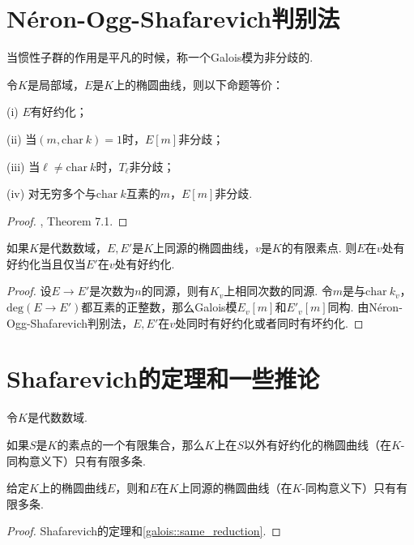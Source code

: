 \section{Néron-Ogg-Shafarevich判别法}

当惯性子群的作用是平凡的时候，称一个Galois模为非分歧的.

\begin{cthm}
    令$K$是局部域，$E$是$K$上的椭圆曲线，则以下命题等价：

    (i) $E$有好约化；

    (ii) 当$(m, \mathrm{char}\ k)=1$时，$E[m]$非分歧；

    (iii) 当$\ell\neq \mathrm{char}\ k$时，$T_{\ell}$非分歧；

    (iv) 对无穷多个与$\mathrm{char}\ k$互素的$m$，$E[m]$非分歧.
\end{cthm}

\begin{proof}
    \cite{silverman2009arithmetic}, Theorem 7.1.
\end{proof}

\begin{ccor}
    如果$K$是代数数域，$E, E'$是$K$上同源的椭圆曲线，$v$是$K$的有限素点. 则$E$在$v$处有好约化当且仅当$E'$在$v$处有好约化. \label{galois::same_reduction}
\end{ccor}

\begin{proof}
    设$E\to E'$是次数为$n$的同源，则有$K_v$上相同次数的同源. 令$m$是与$\mathrm{char}\ k_v$，$\mathrm{deg}(E\to E')$都互素的正整数，那么Galois模$E_v[m]$和$E'_v[m]$同构. 由Néron-Ogg-Shafarevich判别法，$E, E'$在$v$处同时有好约化或者同时有坏约化.
\end{proof}


\section{Shafarevich的定理和一些推论}

令$K$是代数数域.

\begin{cthm}[Shafarevich]
    如果$S$是$K$的素点的一个有限集合，那么$K$上在$S$以外有好约化的椭圆曲线（在$K$-同构意义下）只有有限多条.
\end{cthm}

\begin{ccor}
    给定$K$上的椭圆曲线$E$，则和$E$在$K$上同源的椭圆曲线（在$K$-同构意义下）只有有限多条.\label{galois::isogeny_finite_curves}
\end{ccor}

\begin{proof}
    Shafarevich的定理和\ref{galois::same_reduction}.
\end{proof}
